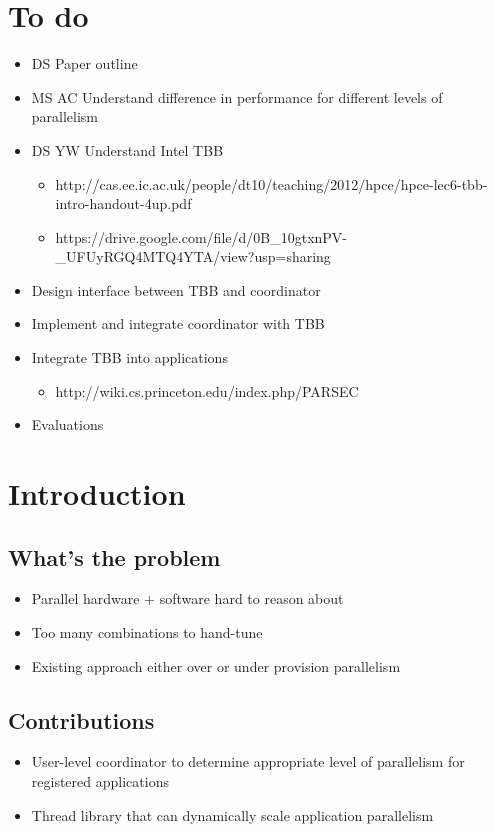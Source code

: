 \documentclass[10pt,preprint]{sigplanconf}
\begin{document}
\section{To do}
\begin{itemize}
  \item DS Paper outline
  \item MS AC Understand difference in performance for different levels of parallelism
  \item DS YW Understand Intel TBB
  \begin{itemize}
    \item http://cas.ee.ic.ac.uk/people/dt10/teaching/2012/hpce/hpce-lec6-tbb-intro-handout-4up.pdf
    \item https://drive.google.com/file/d/0B_10gtxnPV-_UFUyRGQ4MTQ4YTA/view?usp=sharing
  \end{itemize}
  \item Design interface between TBB and coordinator
  \item Implement and integrate coordinator with TBB
  \item Integrate TBB into applications
  \begin{itemize}
    \item http://wiki.cs.princeton.edu/index.php/PARSEC
  \end{itemize}
  \item Evaluations
\end{itemize}

\section{Introduction}
\subsection*{What's the problem}
\begin{itemize}
  \item Parallel hardware + software hard to reason about
  \item Too many combinations to hand-tune
  \item Existing approach either over or under provision parallelism
\end{itemize}
\subsection*{Contributions}
\begin{itemize}
  \item User-level coordinator to determine appropriate level of parallelism for registered applications
  \item Thread library that can dynamically scale application parallelism
\end{itemize}
\end{document}
